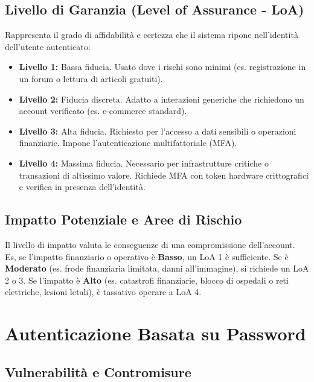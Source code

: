 \subsection{Livello di Garanzia (Level of Assurance - LoA)}
Rappresenta il grado di affidabilità e certezza che il sistema ripone nell'identità dell'utente autenticato:
\begin{itemize}
    \item \textbf{Livello 1:} Bassa fiducia. Usato dove i rischi sono minimi (es. registrazione in un forum o lettura di articoli gratuiti).
    \item \textbf{Livello 2:} Fiducia discreta. Adatto a interazioni generiche che richiedono un account verificato (es. e-commerce standard).
    \item \textbf{Livello 3:} Alta fiducia. Richiesto per l'accesso a dati sensibili o operazioni finanziarie. Impone l'autenticazione multifattoriale (MFA).
    \item \textbf{Livello 4:} Massima fiducia. Necessario per infrastrutture critiche o transazioni di altissimo valore. Richiede MFA con token hardware crittografici e verifica in presenza dell'identità.
\end{itemize}

\subsection{Impatto Potenziale e Aree di Rischio}
Il livello di impatto valuta le conseguenze di una compromissione dell'account. Es, se l'impatto finanziario o operativo è \textbf{Basso}, un LoA 1 è sufficiente. Se è \textbf{Moderato} (es. frode finanziaria limitata, danni all'immagine), si richiede un LoA 2 o 3. Se l'impatto è \textbf{Alto} (es. catastrofi finanziarie, blocco di ospedali o reti elettriche, lesioni letali), è tassativo operare a LoA 4.

\section{Autenticazione Basata su Password}
\subsection{Vulnerabilità e Contromisure}

